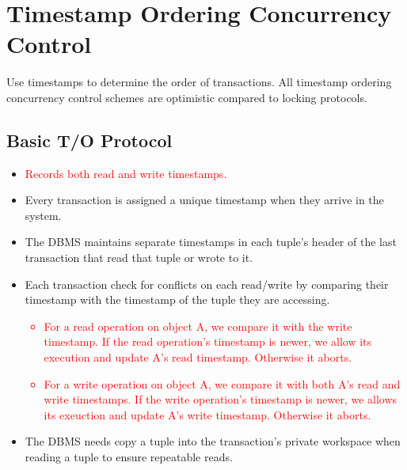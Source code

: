 \documentclass[11pt]{article}
\newcommand{\rr}[1]{\textcolor{red}{#1}}
\begin{document}
\section{Timestamp Ordering Concurrency Control}
Use timestamps to determine the order of transactions. All timestamp ordering concurrency control schemes are optimistic compared to locking protocols.

\subsection*{Basic T/O Protocol}
\begin{itemize}
    \item \rr{Records both read and write timestamps.}

    \item
    Every transaction is assigned a unique timestamp when they arrive in the system.
    
    \item
    The DBMS maintains separate timestamps in each tuple's header of the last transaction that read 
    that tuple or wrote to it.
    
    \item
    Each transaction check for conflicts on each read/write by comparing their timestamp with the 
    timestamp of the tuple they are accessing.
    \rr{
    \begin{itemize}
        \item For a read operation on object A, we compare it with the write timestamp. If the read operation's timestamp is newer, we allow its execution and update A's read timestamp. Otherwise it aborts.
        \item For a write operation on object A, we compare it with both A's read and write timestamps. If the write operation's timestamp is newer, we allows its exeuction and update A's write timestamp. Otherwise it aborts.
    \end{itemize}}
    
    \item
    The DBMS needs copy a tuple into the transaction's private workspace when reading a tuple to 
    ensure repeatable reads.
\end{itemize}

\end{document}
